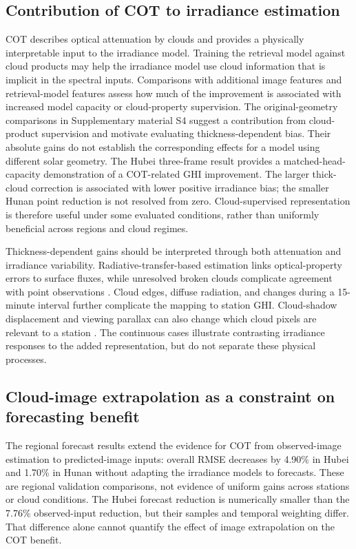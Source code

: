 \documentclass[11pt]{article}
\begin{document}
\subsection{Contribution of COT to irradiance estimation}
COT describes optical attenuation by clouds and provides a physically interpretable input to the irradiance model. Training the retrieval model against cloud products may help the irradiance model use cloud information that is implicit in the spectral inputs. Comparisons with additional image features and retrieval-model features assess how much of the improvement is associated with increased model capacity or cloud-property supervision. The original-geometry comparisons in Supplementary material S4 suggest a contribution from cloud-product supervision and motivate evaluating thickness-dependent bias. Their absolute gains do not establish the corresponding effects for a model using different solar geometry. The Hubei three-frame result provides a matched-head-capacity demonstration of a COT-related GHI improvement. The larger thick-cloud correction is associated with lower positive irradiance bias; the smaller Hunan point reduction is not resolved from zero. Cloud-supervised representation is therefore useful under some evaluated conditions, rather than uniformly beneficial across regions and cloud regimes.

Thickness-dependent gains should be interpreted through both attenuation and irradiance variability. Radiative-transfer-based estimation links optical-property errors to surface fluxes, while unresolved broken clouds complicate agreement with point observations \cite{takenaka2011}. Cloud edges, diffuse radiation, and changes during a 15-minute interval further complicate the mapping to station GHI. Cloud-shadow displacement and viewing parallax can also change which cloud pixels are relevant to a station \cite{miller2018,wiltink2025}. The continuous cases illustrate contrasting irradiance responses to the added representation, but do not separate these physical processes.

\subsection{Cloud-image extrapolation as a constraint on forecasting benefit}
The regional forecast results extend the evidence for COT from observed-image estimation to predicted-image inputs: overall RMSE decreases by 4.90\% in Hubei and 1.70\% in Hunan without adapting the irradiance models to forecasts. These are regional validation comparisons, not evidence of uniform gains across stations or cloud conditions. The Hubei forecast reduction is numerically smaller than the 7.76\% observed-input reduction, but their samples and temporal weighting differ. That difference alone cannot quantify the effect of image extrapolation on the COT benefit.
\end{document}
